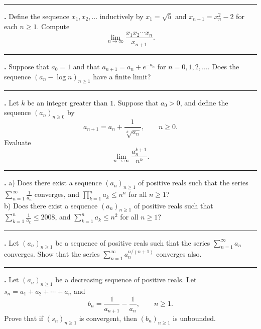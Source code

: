 \documentclass[11pt]{article}
\newcounter{probnum}
\newenvironment{problembox}{\par\noindent\rule{\linewidth}{0.5pt}\vspace{5pt}\par}{\vspace{2pt}}
\begin{document}
\begin{problembox}
\textbf{\theprobnum.} Define the sequence $x_1, x_2, \ldots$ inductively by $x_1 = \sqrt{5}$ and $x_{n+1} = x_n^2 - 2$ for each $n \ge 1$. Compute
\[
\lim_{n \to \infty} \frac{x_1 x_2 \cdots x_n}{x_{n+1}}.
\]
\end{problembox}

\begin{problembox}
\textbf{\theprobnum.} Suppose that $a_0 = 1$ and that $a_{n+1} = a_n + e^{-a_n}$ for $n = 0, 1, 2, \ldots$. Does the sequence $(a_n - \log n)_{n \ge 1}$ have a finite limit?
\end{problembox}

\begin{problembox}
\textbf{\theprobnum.} Let $k$ be an integer greater than $1$. Suppose that $a_0 > 0$, and define the sequence $(a_n)_{n \ge 0}$ by
\[
a_{n+1} = a_n + \frac{1}{\sqrt[k]{a_n}}, \qquad n \ge 0.
\]
Evaluate
\[
\lim_{n \to \infty} \frac{a_n^{k+1}}{n^k}.
\]
\end{problembox}

\begin{problembox}
\textbf{\theprobnum.} a) Does there exist a sequence $(a_n)_{n \ge 1}$ of positive reals such that the series $\displaystyle\sum_{n=1}^{\infty} \frac{1}{a_n}$ converges, and $\displaystyle\prod_{k=1}^{n} a_k \le n^n$ for all $n \ge 1$?\\
b) Does there exist a sequence $(a_n)_{n \ge 1}$ of positive reals such that $\displaystyle\sum_{k=1}^{n} \frac{1}{a_k} \le 2008$, and $\displaystyle\sum_{k=1}^{n} a_k \le n^2$ for all $n \ge 1$?
\end{problembox}

\begin{problembox}
\textbf{\theprobnum.} Let $(a_n)_{n \ge 1}$ be a sequence of positive reals such that the series $\displaystyle\sum_{n=1}^{\infty} a_n$ converges. Show that the series $\displaystyle\sum_{n=1}^{\infty} a_n^{n/(n+1)}$ converges also.
\end{problembox}

\begin{problembox}
\textbf{\theprobnum.} Let $(a_n)_{n \ge 1}$ be a decreasing sequence of positive reals. Let $s_n = a_1 + a_2 + \cdots + a_n$ and
\[
b_n = \frac{1}{a_{n+1}} - \frac{1}{a_n}, \qquad n \ge 1.
\]
Prove that if $(s_n)_{n \ge 1}$ is convergent, then $(b_n)_{n \ge 1}$ is unbounded.
\end{problembox}
\end{document}
